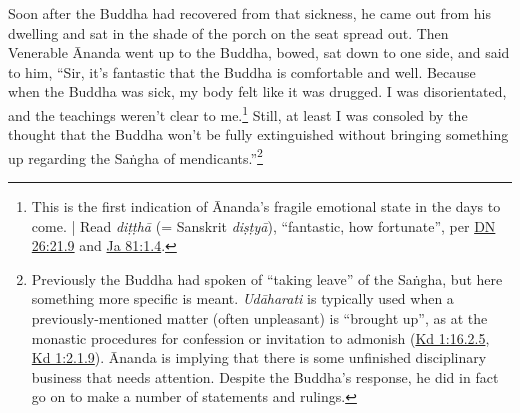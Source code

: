 \documentclass[12pt,openany]{book}%
\begin{document}
Soon after the Buddha had recovered from that sickness, he came out from his dwelling and sat in the shade of the porch on the seat spread out. Then Venerable Ānanda went up to the Buddha, bowed, sat down to one side, and said to him, “Sir, it’s fantastic that the Buddha is comfortable and well. Because when the Buddha was sick, my body felt like it was drugged. I was disorientated, and the teachings weren’t clear to me.\footnote{This is the first indication of Ānanda’s fragile emotional state in the days to come. | Read \textit{\textsanskrit{diṭṭhā}} (= Sanskrit \textit{\textsanskrit{diṣṭyā}}), “fantastic, how fortunate”, per \href{https://suttacentral.net/dn26/en/sujato\#21.9}{DN 26:21.9} and \href{https://suttacentral.net/ja81/en/sujato\#1.4}{Ja 81:1.4}. } Still, at least I was consoled by the thought that the Buddha won’t be fully extinguished without bringing something up regarding the \textsanskrit{Saṅgha} of mendicants.”\footnote{Previously the Buddha had spoken of “taking leave” of the \textsanskrit{Saṅgha}, but here something more specific is meant. \textit{\textsanskrit{Udāharati}} is typically used when a previously-mentioned matter (often unpleasant) is “brought up”, as at the monastic procedures for confession or invitation to admonish (\href{https://suttacentral.net/pli-tv-kd1/en/sujato\#16.2.5}{Kd 1:16.2.5}, \href{https://suttacentral.net/pli-tv-kd1/en/sujato\#2.1.9}{Kd 1:2.1.9}). Ānanda is implying that there is some unfinished disciplinary business that needs attention. Despite the Buddha’s response, he did in fact go on to make a number of statements and rulings. } 
\end{document}
